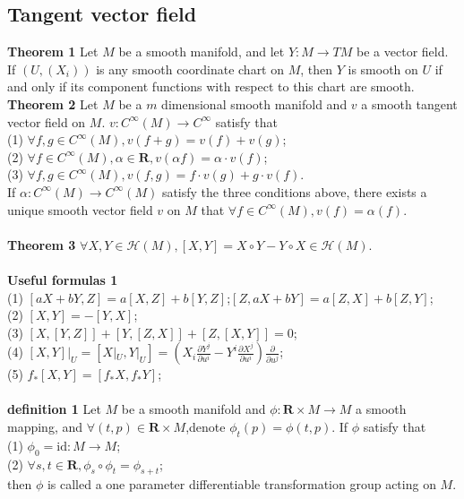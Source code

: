 \documentclass{article}
\begin{document}
\subsection{Tangent vector field}
\textbf{Theorem 1} Let $M$ be a smooth manifold, and let $Y:M \to TM$ be a vector field. If $(U, (X_i))$ is any smooth coordinate chart on $M$, then $Y$ is smooth on $U$ if and only if its component functions with respect to this chart are smooth.\\
\textbf{Theorem 2} Let $M$ be a $m$ dimensional smooth manifold and $v$ a smooth tangent vector field on $M$. $v:C^{\infty}(M) \to C^{\infty}$ satisfy that\\
(1) $\forall f,g \in C^{\infty}(M),v(f+g)=v(f)+v(g)$;\\
(2) $\forall f \in C^{\infty}(M),\alpha \in \mathbf{R},v(\alpha f)=\alpha \cdot v(f)$;\\
(3) $\forall f,g \in C^{\infty}(M),v(f,g) = f \cdot v(g) + g \cdot v(f)$.\\
If $\alpha:C^{\infty}(M) \to C^{\infty}(M)$ satisfy the three conditions above, there exists a unique smooth vector field $v$ on $M$ that $\forall f \in C^{\infty}(M),v(f)=\alpha(f)$.\\ \\
\textbf{Theorem 3} $\forall X,Y \in \mathcal{H}(M),[X,Y]=X \circ Y -Y \circ X \in \mathcal{H}(M)$.\\ \\
\textbf{Useful formulas 1}\\
(1) $[aX+bY,Z]=a[X,Z]+b[Y,Z]$;$[Z,aX+bY]=a[Z,X]+b[Z,Y]$;\\
(2) $[X,Y]=-[Y,X]$;\\
(3) $[X,[Y,Z]] + [Y,[Z,X]] +[Z,[X,Y]]=0$;\\
(4) $[X,Y]|_{U} = [X|_{U},Y|_{U}] = (X_i \frac{\partial Y^j}{\partial u^i} - Y^i \frac{\partial X^j}{\partial u^i}) \frac{\partial}{\partial u^j}$;\\
(5) $f_{*}[X,Y] = [f_{*}X,f_{*}Y]$;\\ \\
\textbf{definition 1} Let $M$ be a smooth manifold and $\phi:\mathbf{R} \times M \to M$ a smooth mapping, and $\forall (t,p) \in \mathbf{R} \times M$,denote $\phi_{t}(p) = \phi(t,p)$. If $\phi$ satisfy that\\
(1) $\phi_0 = \mathrm{id}:M \to M$;\\
(2) $\forall s,t \in \mathbf{R}, \phi_s \circ \phi_t = \phi_{s+t}$;\\
then $\phi$ is called a one parameter differentiable transformation group acting on $M$.\\
\end{document}
